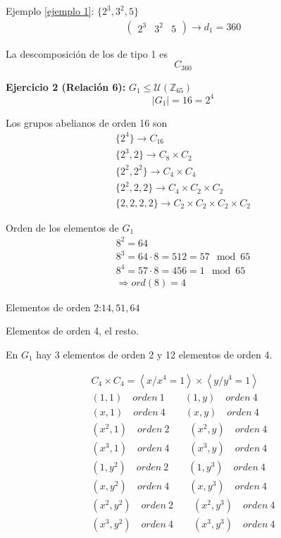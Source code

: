 \documentclass{article}
\begin{document}
Ejemplo \ref{ejemplo 1}: $\{2^3,3^2,5\}$
\begin{gather*}
\begin{pmatrix}
2^3&3^2&5
\end{pmatrix}\rightarrow d_1=360
\end{gather*}

La descomposición de los de tipo 1 es
\begin{equation*}
C_{360}
\end{equation*}

\textbf{Ejercicio 2 (Relación 6):} $G_1\leq \mathcal{U}(\mathbb{Z}_{65})$
\begin{equation*}
|G_1|=16=2^4
\end{equation*}

Los grupos abelianos de orden 16 son
\begin{gather*}
\{2^4\}\longrightarrow C_{16}\\
\{2^3,2\}\longrightarrow C_8\times C_2 \\
\{2^2,2^2\}\longrightarrow C_4\times C_4\\
\{2^2,2,2\}\longrightarrow C_4\times C_2\times C_2\\
\{2,2,2,2\}\longrightarrow C_2\times C_2\times C_2\times C_2
\end{gather*}

Orden de los elementos de $G_1$
\begin{gather*}
8^2=64\\
8^3=64\cdot 8=512=57 \mod{65}\\
8^4=57\cdot 8=456=1\mod{65}\\
\Rightarrow ord(8)=4
\end{gather*}

Elementos de orden 2:$14,51,64$

Elementos de orden 4, el resto. 

En $G_1$ hay 3 elementos de orden 2 y 12 elementos de orden 4.

\begin{gather*}
C_4\times C_4=\left\langle x/x^4=1\right\rangle \times \left\langle y/y^4=1\right\rangle \\
(1,1)\quad orden\:1\qquad (1,y)\quad orden\:4\\
(x,1)\quad orden\:4\qquad (x,y)\quad orden\:4\\
(x^2,1)\quad orden\:2\qquad (x^2,y)\quad orden\:4\\
(x^3,1)\quad orden\:4\qquad (x^3,y)\quad orden\:4\\
(1,y^2)\quad orden\:2\qquad (1,y^3)\quad orden\:4\\
(x,y^2)\quad orden\:4\qquad (x,y^3)\quad orden\:4\\
(x^2,y^2)\quad orden\:2\qquad (x^2,y^3)\quad orden\:4\\
(x^3,y^2)\quad orden\:4\qquad (x^3,y^3)\quad orden\:4
\end{gather*}
\end{document}
